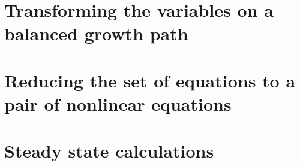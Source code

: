 \documentclass[11pt,letterpaper]{article}
\begin{document}
\newpage
\begin{appendices}
  \section{Transforming the variables on a balanced growth
    path} \label{appendix:a}
  \section{Reducing the set of equations to a pair of nonlinear
    equations} \label{appendix:b}
  \section{Steady state calculations} \label{appendix:c}
\end{appendices}
\end{document}
